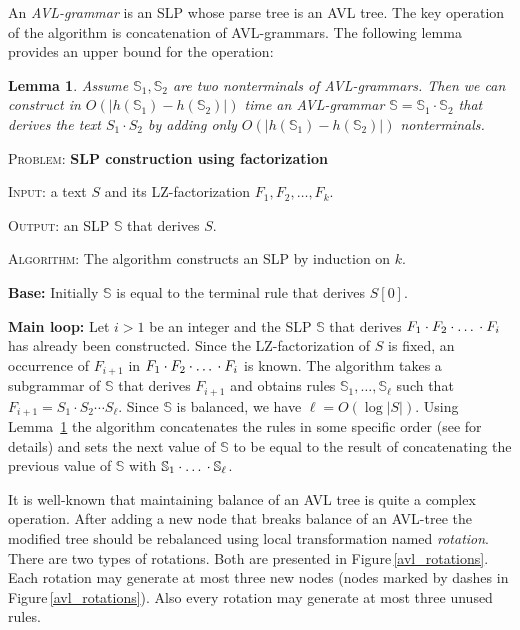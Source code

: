 ﻿\documentclass[11pt]{article}
\newtheorem{lem}[thm]{Lemma}
\theoremstyle{remark}
\newcommand{\slp}[1]{\mathbb{#1}}
\begin{document}
An \emph{AVL-grammar} is an SLP whose parse tree is an AVL tree. The key operation of the algorithm is concatenation of
AVL-grammars. The following lemma provides an upper bound for the operation:

\begin{lem}
\label{avl-lemma}
Assume $\slp{S}_1, \slp{S}_2$ are two nonterminals of AVL-grammars. Then we can construct in $O(|h(\slp{S}_1)
- h(\slp{S}_2)|)$ time an AVL-grammar $\slp{S} = \slp{S}_1 \cdot \slp{S}_2$ that derives the text $S_1\cdot
S_2$ by adding only $O(|h(\slp{S}_1) - h(\slp{S}_2)|)$ nonterminals.
\end{lem}

\noindent \textsc{Problem:} \textbf{SLP construction using factorization}

\noindent \textsc{Input:} a text $S$ and its LZ-factorization $F_1, F_2, \dots, F_k$.

\noindent \textsc{Output:} an SLP $\slp{S}$ that derives $S$.

\noindent \textsc{Algorithm:} The algorithm constructs an SLP by induction on $k$.

\textbf{Base:} Initially $\slp{S}$ is equal to the terminal rule that derives $S[0]$.

\textbf{Main loop:} Let $i > 1$ be an integer and the SLP $\slp{S}$ that derives $F_1\cdot F_2 \cdot \mbox{\dots} \cdot
F_i$ has already been constructed. Since the LZ-factorization of $S$ is fixed, an occurrence of $F_{i+1}$ in $F_1\cdot
F_2 \cdot \mbox{\dots} \cdot F_i$ is known. The algorithm takes a subgrammar of $\slp{S}$ that derives $F_{i+1}$ and
obtains rules $\slp{S}_1, \dots, \slp{S}_\ell$ such that $F_{i+1} = S_1 \cdot S_2 \cdots S_\ell$. Since $\slp{S}$ is
balanced, we have $\ell = O(\log |S|)$. Using Lemma~\ref{avl-lemma} the algorithm concatenates the rules in some specific order
(see \cite{SLPConstruction} for details) and sets the next value of $\slp{S}$ to be equal to the result of
concatenating the previous value of $\slp{S}$ with $\slp{S}_1 \cdot \mbox{\dots} \cdot \slp{S}_\ell$.

It is well-known that maintaining balance of an AVL tree is quite a complex operation. After adding a new node
that breaks balance of an AVL-tree the modified tree should be rebalanced using local transformation named
\emph{rotation}. There are two types of rotations. Both are presented in Figure\,\ref{avl_rotations}. Each rotation may
generate at most three new nodes (nodes marked by dashes in Figure\,\ref{avl_rotations}). Also every rotation may
generate at most three unused rules.
\end{document}
